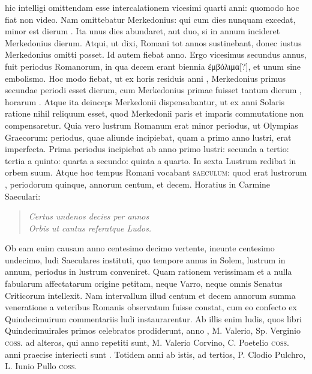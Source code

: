hic intelligi omittendam esse intercalationem vicesimi quarti
anni: quomodo hoc fiat non video.
Nam omittebatur Merkedonius:
qui cum  dies nunquam excedat, minor est dierum
.
Ita unus dies abundaret, aut duo, si in  annum incideret
Merkedonius  dierum.
Atqui, ut dixi, Romani tot annos
sustinebant, donec iustus Merkedonius omitti posset.
Id autem fiebat
 anno.
Ergo vicesimus secundus annus, fuit periodus Romanorum,
in qua decem erant biennia \textgreek{ἐμβόλιμα[?]}, et unum sine embolismo.
%
Hoc modo fiebat,
 ut ex  horis residuis anni , Merkedonius
primus secundae periodi esset  dierum, cum Merkedonius
primae fuisset tantum dierum , horarum .
Atque ita
deinceps Merkedonii dispensabantur, ut ex anni Solaris ratione
nihil reliquum esset, quod Merkedonii paris et imparis commutatione
non compensaretur.
Quia vero lustrum Romanum erat
minor periodus, ut Olympias Graecorum: periodus, quae aliunde
incipiebat, quam a primo anno lustri, erat imperfecta.
Prima periodus
incipiebat ab anno primo lustri: secunda a tertio: tertia a
quinto: quarta a secundo: quinta a quarto.
In sexta Lustrum redibat
in orbem suum.
Atque hoc tempus Romani vocabant \textsc{saeculum}:
quod erat lustrorum , periodorum quinque, annorum centum,
et decem.
Horatius in Carmine Saeculari:
\begin{verse}
  \textit{Certus undenos decies per annos\\
  Orbis ut cantus referatque Ludos.}
\end{verse}
Ob eam enim causam anno centesimo decimo vertente, ineunte
centesimo undecimo, ludi Saeculares instituti, quo tempore annus
in Solem, lustrum in annum, periodus in lustrum conveniret.
Quam
rationem verissimam et a nulla fabularum affectatarum origine petitam,
neque Varro, neque omnis Senatus Criticorum intellexit.
Nam intervallum illud centum et decem annorum summa veneratione
a veteribus Romanis observatum fuisse constat, cum eo
confecto ex Quindecimuirum commentariis ludi instaurarentur.
Ab illis enim ludis, quos libri Quindecimuirales primos celebratos
prodiderunt, anno , M. Valerio, Sp. Verginio
\textsc{coss.} ad alteros, qui anno  repetiti sunt, M. Valerio
Corvino, C. Poetelio \textsc{coss.} anni praecise interiecti sunt .
Totidem
anni ab istis, ad tertios, P. Clodio Pulchro, L. Iunio Pullo \textsc{coss.}
